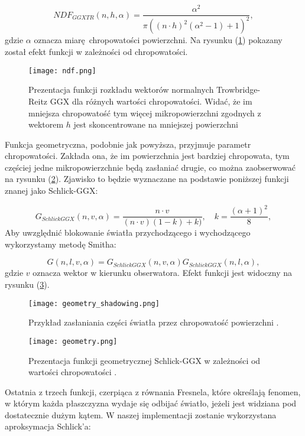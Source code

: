 $$
NDF_{GGXTR}(n,h,\alpha) = \frac{\alpha^2}{\pi\left( (n\cdot h)^2 (\alpha^2 - 1) + 1 \right)^2 },
$$
gdzie $\alpha$ oznacza miarę chropowatości powierzchni. Na rysunku (\ref{normaldistribution}) pokazany został efekt funkcji w zależności od chropowatości.


\begin{figure}[h]
	\centering
	\texttt{[image: ndf.png]}
	\caption{Prezentacja funkcji rozkładu wektorów normalnych Trowbridge-Reitz GGX dla różnych wartości chropowatości. Widać, że im mniejsza chropowatość tym więcej mikropowierzchni zgodnych z wektorem $h$ jest skoncentrowane na mniejszej powierzchni}
	\label{normaldistribution}
\end{figure}

Funkcja geometryczna, podobnie jak powyższa, przyjmuje parametr chropowatości. Zakłada ona, że im powierzchnia jest bardziej chropowata, tym częściej jedne mikropowierzchnie będą zasłaniać drugie, co można zaobserwować na rysunku (\ref{geometry_shadowing}). Zjawisko to będzie wyznaczane na podstawie poniższej funkcji znanej jako Schlick-GGX:

$$
G_{SchlickGGX}(n,v,\alpha) = \frac{n \cdot v}{(n\cdot v)(1-k) + k)}, \hspace{1em} k = \frac{(\alpha+1)^2}{8},
$$
Aby uwzględnić blokowanie światła przychodzącego i wychodzącego wykorzystamy metodę Smitha:

$$
G(n, l, v, \alpha)  = G_{SchlickGGX}(n,v,\alpha)G_{SchlickGGX}(n,l,\alpha),
$$
gdzie $v$ oznacza wektor w kierunku obserwatora. Efekt funkcji jest widoczny na rysunku (\ref{geometry}).

\begin{figure}[h]
	\centering
	\texttt{[image: geometry\_shadowing.png]}
	\caption{Przykład zasłaniania części światła przez chropowatość powierzchni \cite{learnopengl}.}
	\label{geometry_shadowing}
\end{figure}


\begin{figure}[h]
	\centering
	\texttt{[image: geometry.png]}
	\caption{Prezentacja funkcji geometrycznej Schlick-GGX w zależności od wartości chropowatości \cite{learnopengl}.}
	\label{geometry}
\end{figure}

Ostatnia z trzech funkcji, czerpiąca z równania Fresnela, które określają fenomen, w którym każda płaszczyzna wydaje się odbijać światło, jeżeli jest widziana pod dostatecznie dużym kątem. W naszej implementacji zostanie wykorzystana aproksymacja Schlick'a:

